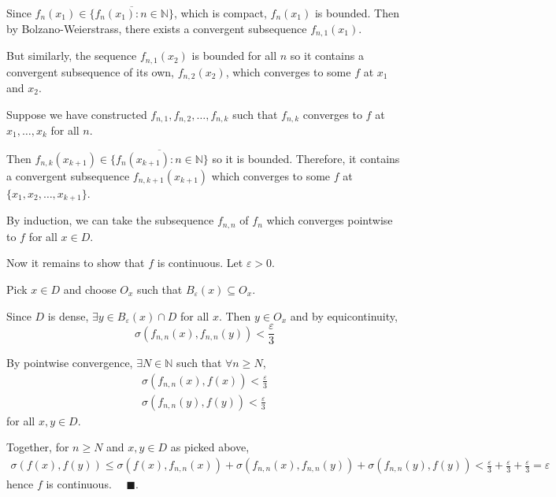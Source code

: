 \documentclass[12pt]{article}
\newcommand{\N}{\mathbb{N}}
\newcommand{\qed}{\quad \blacksquare}
\newcommand{\ep}{\varepsilon}
\newcommand{\sub}{\subseteq}
\begin{document}
        Since $f_n(x_1) \in \overline{\{f_n(x_1): n \in \N\}}$, which is compact, $f_n(x_1)$ is bounded. Then by Bolzano-Weierstrass, there exists a convergent subsequence $f_{n, 1}(x_1)$.

        But similarly, the sequence $f_{n, 1}(x_2)$ is bounded for all $n$ so it contains a convergent subsequence of its own, $f_{n, 2}(x_2)$, which converges to some $f$ at $x_1$ and $x_2$. 

        Suppose we have constructed $f_{n,1}, f_{n, 2}, \dots, f_{n, k}$ such that $f_{n,k}$ converges to $f$ at $x_1, \dots, x_k$ for all $n$. 

        Then $f_{n, k}(x_{k+1})\in \overline{\{f_n(x_{k+1}): n \in \N\}}$ so it is bounded. Therefore, it contains a convergent subsequence $f_{n, k+1}(x_{k+1})$ which converges to some $f$ at $\{x_1, x_2, \dots, x_{k+1}\}$.

        By induction, we can take the subsequence $f_{n, n}$ of $f_n$ which converges pointwise to $f$ for all $x \in D$.

        Now it remains to show that $f$ is continuous. Let $\ep > 0$. 

        Pick $x \in D$ and choose $O_x$ such that $B_{\ep}(x) \sub O_x$. 

        Since $D$ is dense, $\exists y \in B_{\ep}(x) \cap D$ for all $x$. Then $y \in O_x$ and by equicontinuity, 
        \[\sigma(f_{n,n}(x), f_{n, n}(y)) < \frac{\ep}{3}\]

        By pointwise convergence, $\exists N \in \N$ such that $\forall n \geq N$, 
        \begin{align*}
            \sigma(f_{n, n}(x), f(x)) < \frac{\ep}{3}\\ 
            \sigma(f_{n, n}(y), f(y)) < \frac{\ep}{3}
        \end{align*}
        for all $x, y \in D$.

        Together, for $n \geq N$ and $x, y \in D$ as picked above, 
        \begin{align*}
            \sigma(f(x), f(y)) \leq \sigma(f(x), f_{n, n}(x)) + \sigma(f_{n, n}(x), f_{n, n}(y)) + \sigma(f_{n, n}(y), f(y)) < \frac{\ep}{3} + \frac{\ep}{3} + \frac{\ep}{3} = \ep
        \end{align*}
        hence $f$ is continuous. $\qed$.
       
\end{document}
